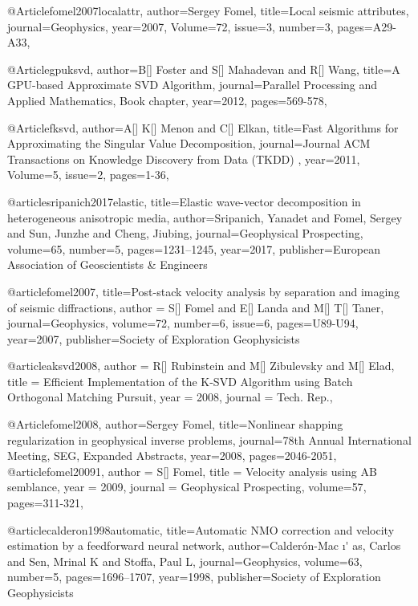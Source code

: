 @Article{fomel2007localattr,
  author={Sergey Fomel},
  title={Local seismic attributes},
  journal={Geophysics},
  year=2007,
  Volume=72,
  issue=3,
  number=3,
  pages={A29-A33},
}

@Article{gpuksvd,
  author={B[] Foster and S[] Mahadevan and R[] Wang},
  title={A {GPU}-based Approximate {SVD} Algorithm},
  journal={Parallel Processing and Applied Mathematics, Book chapter},
  year=2012,
  pages={569-578},
}

@Article{fksvd,
  author={A[] K[] Menon and C[] Elkan},
  title={Fast Algorithms for Approximating the Singular Value Decomposition},
  journal={Journal ACM Transactions on Knowledge Discovery from Data (TKDD) },
  year=2011,
  Volume=5,
  issue=2,
  pages={1-36},
}


@article{sripanich2017elastic,
  title={Elastic wave-vector decomposition in heterogeneous anisotropic media},
  author={Sripanich, Yanadet and Fomel, Sergey and Sun, Junzhe and Cheng, Jiubing},
  journal={Geophysical Prospecting},
  volume={65},
  number={5},
  pages={1231--1245},
  year={2017},
  publisher={European Association of Geoscientists \& Engineers}
}






@article{fomel2007,
  title={Post-stack velocity analysis by separation and imaging of seismic diffractions},
  author =	 {S[] Fomel and E[] Landa and M[] T[] Taner},
  journal={Geophysics},
  volume={72},
  number={6},
  issue=6,
  pages={U89-U94},
  year={2007},
  publisher={Society of Exploration Geophysicists}
}

@article{aksvd2008,
  author =	 {R[] Rubinstein and M[] Zibulevsky and M[] Elad},
  title =	 {Efficient Implementation of the {K-SVD} Algorithm using Batch Orthogonal Matching Pursuit},
  year =	 2008,
  journal =	 {Tech. Rep.},
}

@Article{fomel2008,
  author={Sergey Fomel},
  title={Nonlinear shapping regularization in geophysical inverse problems},
  journal={78th Annual International Meeting, SEG, Expanded Abstracts},
  year=2008,
  pages={2046-2051},
}
@article{fomel20091,
  author =	 {S[] Fomel},
  title =	 {Velocity analysis using {AB} semblance},
  year =	 2009,
  journal =	 {Geophysical Prospecting},
  volume={57},
 pages=311-321,
}

@article{calderon1998automatic,
  title={Automatic NMO correction and velocity estimation by a feedforward neural network},
  author={Calder{\'o}n-Mac {\i}{\'{}} as, Carlos and Sen, Mrinal K and Stoffa, Paul L},
  journal={Geophysics},
  volume={63},
  number={5},
  pages={1696--1707},
  year={1998},
  publisher={Society of Exploration Geophysicists}
}

